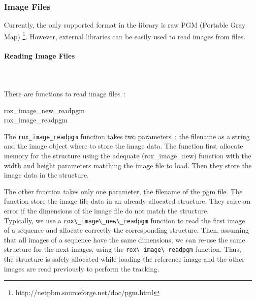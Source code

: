 \subsubsection{Image Files}
\label{sss:image_files}   

Currently, the only supported format in the library is raw PGM
(Portable Gray Map)
\footnote{{http://netpbm.sourceforge.net/doc/pgm.html}}. However,
external libraries can be easily used to read images from files. \\



\paragraph{Reading Image Files}
\label{sss:image_files-reading}
~\\~\\
There are functions to read image files~:

\begin{description}
  \item [rox\_image\_new\_readpgm]
  \item [rox\_image\_readpgm]
\end{description}

The \lstinline$rox_image_readpgm$ function takes two parameters~: the
filename as a string and the image object where to store the image
data. The function first allocate memory for the structure using the
adequate (rox\_image\_new) function with the width and height
parameters matching the image file to load. Then they store the image
data in the structure.

The other function takes only one parameter, the filename of the pgm file. The function store the image file data in an already allocated structure. They raise an error if the dimensions of the image file do not match the structure.\\

Typically, we use a \lstinline$rox\_image\_new\_readpgm$ function to
read the first image of a sequence and allocate correctly the
corresponding structure. Then, assuming that all images of a sequence
have the same dimensions, we can re-use the same structure for the
next images, using the \lstinline$rox\_image\_readpgm$ function. Thus,
the structure is safely allocated while loading the reference image
and the other images are read previously to perform the tracking.

